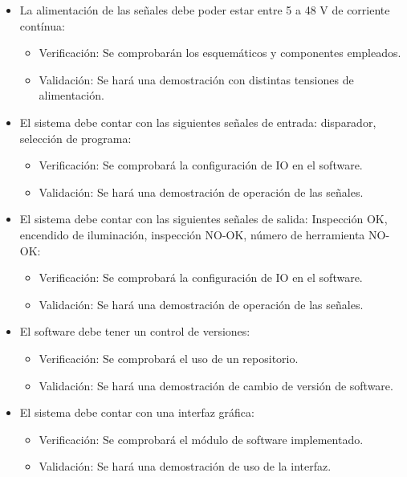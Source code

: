 \documentclass[
11pt, %
codirector, %
]{charter}
\begin{document}
\begin{itemize}
	\item \REQ La alimentación de las señales debe poder estar entre 5 a 48 V de corriente contínua:
	\begin{itemize}
		\item Verificación: Se comprobarán los esquemáticos y componentes empleados.
		\item Validación: Se hará una demostración con distintas tensiones de alimentación.
	\end{itemize}
	
	\item \REQ El sistema debe contar con las siguientes señales de entrada: disparador, selección de programa:
	\begin{itemize}
		\item Verificación: Se comprobará la configuración de IO en el software.
		\item Validación: Se hará una demostración de operación de las señales.
	\end{itemize}
	
	\item \REQ El sistema debe contar con las siguientes señales de salida: Inspección OK, encendido de iluminación, inspección NO-OK, número de herramienta NO-OK:
	\begin{itemize}
		\item Verificación: Se comprobará la configuración de IO en el software.
		\item Validación: Se hará una demostración de operación de las señales.
	\end{itemize}
	
	\item \REQ El software debe tener un control de versiones:
	\begin{itemize}
		\item Verificación: Se comprobará el uso de un repositorio.
		\item Validación: Se hará una demostración de cambio de versión de software.
	\end{itemize}
	
	\item \REQ El sistema debe contar con una interfaz gráfica:
	\begin{itemize}
		\item Verificación: Se comprobará el módulo de software implementado.
		\item Validación: Se hará una demostración de uso de la interfaz.
	\end{itemize}
	

\end{itemize}
\end{document}
